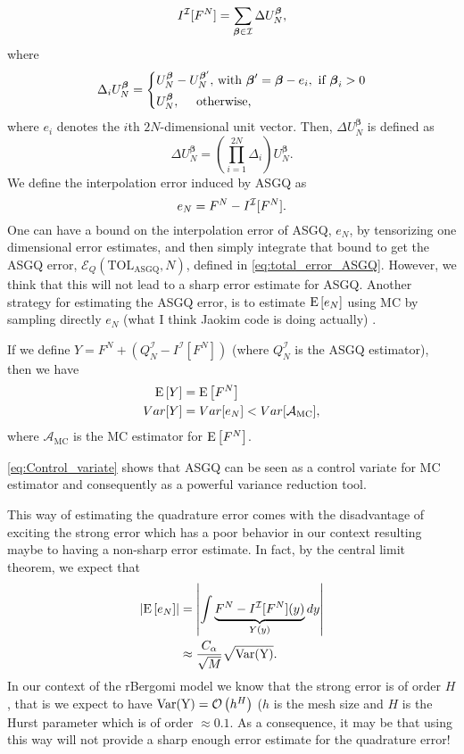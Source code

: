 \begin{equation}
I^{\mathcal{I}}[F^N]= \sum_{\boldsymbol{\beta} \in \mathcal{I}} \Delta U_N^{\boldsymbol{\beta}} ,
\end{equation}
where 
\begin{equation*}
\Delta_i U_N^{\boldsymbol{\beta}} = \left\{ 
\aligned 
 U_N^{\boldsymbol{\beta}} &- U_N^{\boldsymbol{\beta}'}  \text{, with } \boldsymbol{\beta}' =\boldsymbol{\beta} - e_i, \text{ if } \boldsymbol{\beta}_i>0 \\
 U_N^{\boldsymbol{\beta}} &, \quad  \text{ otherwise,}
\endaligned
\right.
\end{equation*}
where $e_i$ denotes the $i$th $2N$-dimensional unit vector. Then, $\Delta
U_N^{\boldsymbol{\beta}}$ is defined as
\begin{equation*}
\Delta U_N^{\boldsymbol{\beta}} = \left( \prod_{i=1}^{2N} \Delta_i \right) U_N^{\boldsymbol{\beta}}.
\end{equation*}
We define the interpolation error induced by ASGQ as
\begin{equation}
e_{N}= F^N-I^{\mathcal{I}}[F^N] .
\end{equation}
One can have a bound on the interpolation error of ASGQ, $e_{N}$, by tensorizing one dimensional error estimates, and  then simply integrate that bound to get the ASGQ  error, $\mathcal{E}_Q(\text{TOL}_{\text{ASGQ}},N)$, defined in \eqref{eq:total_error_ASGQ}. However, we think that this will  not lead to a sharp error estimate for ASGQ. Another strategy for estimating the ASGQ  error, is to estimate $\mathrm{E}\left[e_N\right]$ using MC by sampling directly $e_N$ (what I think Jaokim code is doing actually) .

If we define $Y=F^N+(Q_N^{\mathcal{I}}-I^{\mathcal{I}}[F^N])$ (where $Q_N^{\mathcal{I}}$ is the ASGQ  estimator), then we have
\begin{align}\label{eq:Control_variate}
\mathrm{E}\left[Y\right]&=\mathrm{E}\left[F^N\right]\nonumber\\
Var[Y]&=Var[e_N]< Var[\mathcal{A}_{\text{MC}}],
\end{align}
where $\mathcal{A}_{\text{MC}}$ is the MC estimator for $\mathrm{E}\left[F^N\right]$.

\eqref{eq:Control_variate} shows that ASGQ can be seen as a control variate for MC estimator and consequently as a powerful variance reduction tool.

This way of estimating the quadrature error comes with the disadvantage of exciting the strong error which has a poor behavior in our context resulting maybe to having a non-sharp error estimate. In fact, by the central limit theorem, we expect that
\begin{align}\label{eq:CLT_interpol_errror}
\left\lvert\mathrm{E}\left[e_N\right]\right\rvert&=\left\lvert\int \underbrace{F^N-I^{\mathcal{I}}[F^N](y)}_{Y(y)} dy\right\rvert\nonumber\\
&\approx \frac{C_\alpha}{\sqrt{M}} \sqrt{\text{Var(Y)}}.
\end{align}
In our context of the rBergomi model we know that the strong error is of order $H$, that is we expect to have $\text{Var(Y)}={\mathcal{O}}\left(h^H\right)$ ($h$ is the mesh size and $H$ is the Hurst parameter which is of order $\approx 0.1$. As a consequence, it may be that using this way will not provide a sharp enough error estimate for the quadrature error!

